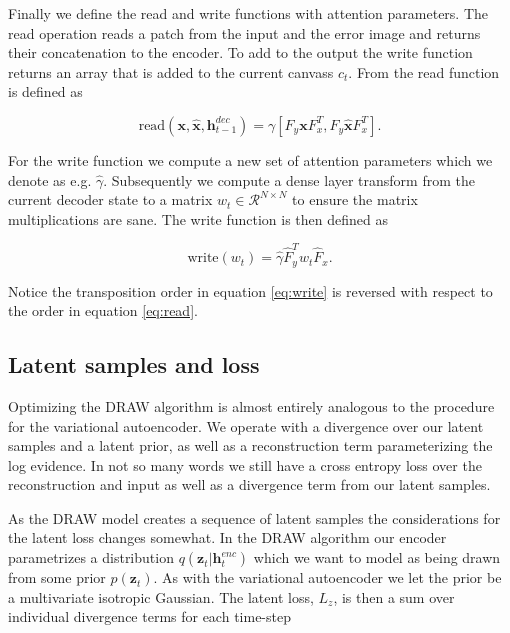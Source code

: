 Finally we define the read and write functions with attention parameters. The read operation reads a patch from the input and the error image and returns their concatenation to the encoder. To add to the output the write function returns an array that is added to the current canvass $c_t$. From \citet{Gregor2015} the read function is defined as

\begin{equation}\label{eq:read}
\text{read}(\mathbf{x}, \mathbf{\hat{x}}, \mathbf{h}_{t-1}^{dec}) = \gamma[F_y \mathbf{x} F_x^T, F_y \mathbf{\hat{x}} F_x^T].
\end{equation} 

\noindent For the write function we compute a new set of attention parameters which we denote as e.g. $\hat{\gamma}$. Subsequently we compute a dense layer transform from the current decoder state to a matrix $w_t \in \mathcal{R}^{N \times N}$ to ensure the matrix multiplications are sane. The write function is then defined as

\begin{equation}\label{eq:write}
\text{write}(w_t)  = \hat{\gamma} \hat{F}^T_y w_t \hat{F}_x.
\end{equation}

\noindent Notice the transposition order in equation \ref{eq:write} is reversed with respect to the order in equation \ref{eq:read}. 

\subsection{Latent samples and loss}

Optimizing the DRAW algorithm is almost entirely analogous to the procedure for the variational autoencoder. We operate with a divergence over our latent samples and a latent prior, as well as a reconstruction term parameterizing the log evidence. In not so many words we still have a cross entropy loss over the reconstruction and input as well as a divergence term from our latent samples.  

As the DRAW model creates a sequence of latent samples the considerations for the latent loss changes somewhat. In the DRAW algorithm our encoder parametrizes a distribution $q(\mathbf{z}_t | \mathbf{h}_t^{enc})$ which we want to model as being drawn from some prior $p(\mathbf{z}_t)$. As with the variational autoencoder we let the prior be a multivariate isotropic Gaussian. The latent loss, $L_z$, is then a sum over individual divergence terms for each time-step

